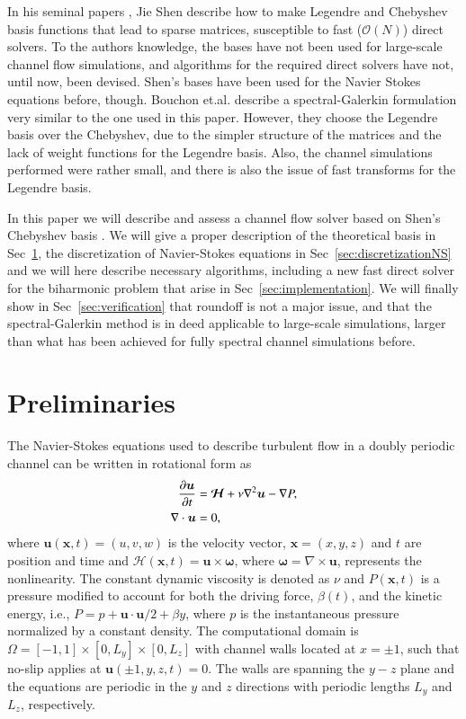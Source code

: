 \documentclass[11pt, oneside]{elsarticle}
\begin{document}
In his seminal papers \cite{Shen94,Shen95}, Jie Shen describe how to make Legendre and Chebyshev basis functions that lead to sparse matrices, susceptible to fast ($\mathcal{O}(N)$) direct solvers. To the authors knowledge, the bases have not been used for large-scale channel flow simulations, and algorithms for the required direct solvers have not, until now, been devised. Shen's bases have been used for the Navier Stokes equations before, though. Bouchon et.al.  \cite{Bouchon01} describe a spectral-Galerkin formulation very similar to the one used in this paper. However, they choose the Legendre basis over the Chebyshev, due to the simpler structure of the matrices and the lack of weight functions for the Legendre basis. Also, the channel simulations performed were rather small, and there is also the issue of fast transforms for the Legendre basis.

In this paper we will describe and assess a channel flow solver based on Shen's Chebyshev basis \cite{Shen95}. We will give a proper description of the theoretical basis in Sec~\ref{sec:prelim}, the discretization of Navier-Stokes equations in Sec~\ref{sec:discretizationNS} and we will here describe necessary algorithms, including a new fast direct solver for the biharmonic problem that arise in Sec~\ref{sec:implementation}. We will finally show in Sec~\ref{sec:verification} that roundoff is not a major issue, and that the spectral-Galerkin method is in deed applicable to large-scale simulations, larger than what has been achieved for fully spectral channel simulations before.

\section{Preliminaries}
\label{sec:prelim}
The Navier-Stokes equations used to describe turbulent flow in a doubly 
periodic channel can be written in rotational form as
\begin{align}
 \frac{\partial \bm{u}}{\partial t}   &= \bm{\mathcal{H}} + \nu 
 \nabla^2 \bm{u} - \nabla{P}, \notag \\
 \nabla \cdot \bm{u} &= 0, \label{eq:NS}
\end{align}
where $\bm{u}(\bm{x}, t)=(u, v, w)$ is the velocity vector, $\bm{x}=(x, y, z)$ 
and $t$ are position and time and $\bm{\mathcal{H}}(\bm{x}, t) = \bm{u}\times 
\bm{\omega}$, where $\bm{\omega} = \nabla \times \bm{u}$, represents 
the nonlinearity.  The constant dynamic viscosity is denoted as $\nu$ 
and $P(\bm{x}, t)$ is a pressure modified to account for both the driving force, $\beta(t)$, and the kinetic energy, i.e., $P = p + \bm{u} \cdot \bm{u}/2 + \beta y$, where $p$ is the instantaneous 
pressure normalized by a constant density. The computational domain is 
$\Omega=[-1, 1]\times [0, L_y] \times [0, L_z]$ with channel walls 
located at $x=\pm 1$, such that no-slip applies at 
$ \bm{u}(\pm 1, y, z, t) = 0$. The walls are spanning 
the $y-z$ plane and the equations are periodic in the $y$ and $z$ directions with periodic lengths $L_y$ and $L_z$, respectively.
\end{document}
